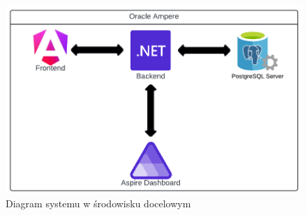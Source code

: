 \begin{figure}[H]
    \centering
    \includegraphics[width=1\textwidth]{attachments/arch-diag}
    \caption{Diagram systemu w środowisku docelowym}
    \label{fig:figure}
\end{figure}

